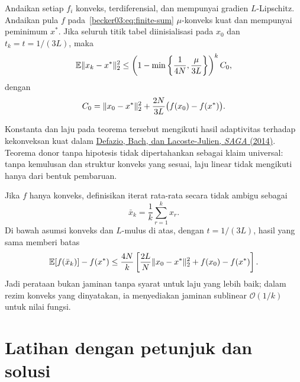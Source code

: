 \begin{theorem}
  \label{becker03:theorem:linear-rate}
  Andaikan setiap $f_i$ konveks, terdiferensial, dan mempunyai gradien
  $L$-Lipschitz. Andaikan pula $f$ pada~\eqref{becker03:eq:finite-sum}
  $\mu$-konveks kuat dan mempunyai peminimum $x^*$. Jika seluruh titik tabel
  diinisialisasi pada $x_0$ dan $t_k=t=1/(3L)$, maka
  \begin{equation}
    \label{becker03:eq:linear-rate}
    \mathbb{E}\|x_k-x^*\|_2^2
    \leq
    \left(1-\min\left\{\frac{1}{4N},\frac{\mu}{3L}\right\}\right)^k C_0,
  \end{equation}
  dengan
  \begin{equation}
    C_0=\|x_0-x^*\|_2^2
      +\frac{2N}{3L}\bigl(f(x_0)-f(x^*)\bigr).
  \end{equation}
\end{theorem}

Konstanta dan laju pada teorema tersebut mengikuti hasil adaptivitas terhadap
kekonveksan kuat dalam
\href{https://arxiv.org/abs/1407.0202}{Defazio, Bach, dan Lacoste-Julien,
\emph{SAGA} (2014)}. Teorema donor tanpa hipotesis tidak dipertahankan sebagai
klaim universal: tanpa kemulusan dan struktur konveks yang sesuai, laju linear
tidak mengikuti hanya dari bentuk pembaruan.

Jika $f$ hanya konveks, definisikan iterat rata-rata secara tidak ambigu sebagai
\begin{equation}
  \label{becker03:eq:average-iterate}
  \bar x_k=\frac1k\sum_{r=1}^{k}x_r.
\end{equation}
Di bawah asumsi konveks dan $L$-mulus di atas, dengan $t=1/(3L)$, hasil yang
sama memberi batas
\begin{equation}
  \label{becker03:eq:average-rate}
  \mathbb{E}[f(\bar x_k)]-f(x^*)
  \leq\frac{4N}{k}
  \left[
    \frac{2L}{N}\|x_0-x^*\|_2^2+f(x_0)-f(x^*)
  \right].
\end{equation}
Jadi perataan bukan jaminan tanpa syarat untuk laju yang lebih baik; dalam
rezim konveks yang dinyatakan, ia menyediakan jaminan sublinear
$\mathcal O(1/k)$ untuk nilai fungsi.

\section{Latihan dengan petunjuk dan solusi}
\label{becker03:section:exercises}

